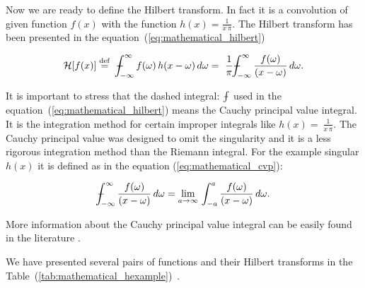 \documentclass[12pt,twoside,a4paper]{article}
\numberwithin{equation}{subsection}
\numberwithin{figure}{subsection}
\def\Xint#1{\mathchoice
{\XXint\displaystyle\textstyle{#1}}%
{\XXint\textstyle\scriptstyle{#1}}%
{\XXint\scriptstyle\scriptscriptstyle{#1}}%
{\XXint\scriptscriptstyle\scriptscriptstyle{#1}}%
\!\int}
\def\XXint#1#2#3{{\setbox0=\hbox{$#1{#2#3}{\int}$ }\vcenter{\hbox{$#2#3$ }}\kern-.6\wd0}}
\def\dashint{\Xint-}
\begin{document}
Now we are ready to define the Hilbert transform. In fact it is a convolution of given function $f(x)$ with the function $h(x) =
\frac{1}{x \, \pi}$. The Hilbert transform has been presented in the equation~(\ref{eq:mathematical_hilbert})

\begin{equation} \label{eq:mathematical_hilbert}
	\mathcal{H}[f(x)] \stackrel{\mathrm{def}}{=}
	 \ \dashint_{ - \infty }^{\infty } f(\omega) \, h(x - \omega) \, d\omega 
	=\ \frac{1}{\pi} \dashint_{ - \infty }^{\infty } \frac{f(\omega)}{(x - \omega)} \, d\omega . 
\end{equation}

It is important to stress that the dashed integral: $\dashint$ used in the equation~(\ref{eq:mathematical_hilbert}) means the Cauchy
principal value integral. It is the integration method for certain improper integrals like $h(x) =\ \frac{1}{x \, \pi}$. The Cauchy
principal value was designed to omit the singularity and it is a less rigorous integration method than the Riemann integral. For the example
singular $ h(x) $ it is defined as in the equation (\ref{eq:mathematical_cvp}):

\begin{equation} \label{eq:mathematical_cvp}
	\dashint_{ - \infty }^{\infty } \frac{f(\omega)}{(x - \omega)} \, d\omega = \lim_{a \to \infty}\,\int_{ - a}^{a }
	\frac{f(\omega)}{(x - \omega)} \, d\omega . 
\end{equation}

More information about the Cauchy principal value integral can be easily found in the literature \cite{henrici_applied}.

We have presented several pairs of functions and their Hilbert transforms in the
Table~(\ref{tab:mathematical_hexample})~\cite{weisstein_hilbert}.
\end{document}
